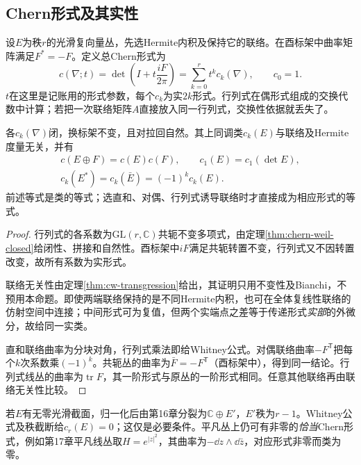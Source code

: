 \subsection{Chern形式及其实性}
设$E$为秩$r$的光滑复向量丛，先选Hermite内积及保持它的联络。在酉标架中曲率矩阵满足$F^*=-F$。定义总Chern形式为
\begin{equation}\label{eq:total-chern}
 c(\nabla;t)=\det\left(I+t\frac{iF}{2\pi}\right)
 =\sum_{k=0}^r t^k c_k(\nabla),\qquad c_0=1.
\end{equation}
$t$在这里是记账用的形式参数，每个$c_k$为实$2k$形式。行列式在偶形式组成的交换代数中计算；若把一次联络矩阵$A$直接放入同一行列式，交换性依据就丢失了。

\begin{proposition}\label{prop:chern-properties}
各$c_k(\nabla)$闭，换标架不变，且对拉回自然。其上同调类$c_k(E)$与联络及Hermite度量无关，并有
\begin{gather*}
 c(E\oplus F)=c(E)c(F),\qquad c_1(E)=c_1(\det E),\\
 c_k(E^*)=c_k(\bar E)=(-1)^kc_k(E).
\end{gather*}
前述等式是类的等式；选直和、对偶、行列式诱导联络时才直接成为相应形式的等式。
\end{proposition}
\begin{proof}
行列式的各系数为$\mathrm{GL}(r,\mathbb C)$共轭不变多项式，由定理\ref{thm:chern-weil-closed}给闭性、拼接和自然性。酉标架中$iF$满足共轭转置不变，行列式又不因转置改变，故所有系数为实形式。

联络无关性由定理\ref{thm:cw-transgression}给出，其证明只用不变性及Bianchi，不预用本命题。即使两端联络保持的是不同Hermite内积，也可在全体复线性联络的仿射空间中连接；中间形式可为复值，但两个实端点之差等于传递形式\emph{实部}的外微分，故给同一实类。

直和联络曲率为分块对角，行列式乘法即给Whitney公式。对偶联络曲率$-F^{\mathsf T}$把每个$k$次系数乘$(-1)^k$。共轭丛的曲率为$\bar F=-F^{\mathsf T}$（酉标架中），得到同一结论。行列式线丛的曲率为$\operatorname{tr}F$，其一阶形式与原丛的一阶形式相同。任意其他联络再由联络无关性比较。
\end{proof}
若$E$有无零光滑截面，归一化后由第16章分裂为$\mathbb C\oplus E'$，$E'$秩为$r-1$。Whitney公式及秩截断给$c_r(E)=0$；这仅是必要条件。平凡丛上仍可有非零的\emph{恰当}Chern形式，例如第17章平凡线丛取$H=e^{|z|^2}$，其曲率为$-\dd z\wedge\dd\bar z$，对应形式非零而类为零。

